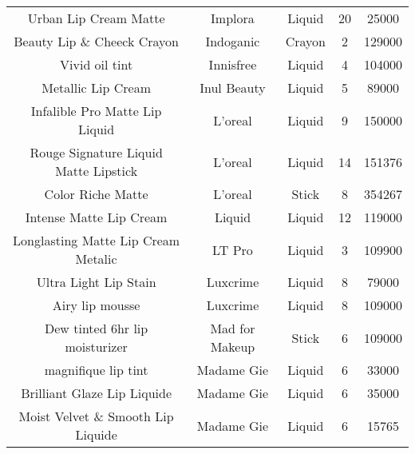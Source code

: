 \begin{table}[htbp]
\begin{tabular}{ccccc}
        Urban Lip Cream Matte                   & Implora           & Liquid                       & 20              & 25000          \\
        Beauty Lip \& Cheeck Crayon             & Indoganic         & Crayon                       & 2               & 129000         \\
        Vivid oil tint                          & Innisfree         & Liquid                       & 4               & 104000         \\
        Metallic Lip Cream                      & Inul Beauty       & Liquid                       & 5               & 89000          \\
        Infalible Pro Matte Lip Liquid          & L'oreal           & Liquid                       & 9               & 150000         \\
        Rouge Signature Liquid Matte Lipstick   & L'oreal           & Liquid                       & 14              & 151376         \\
        Color Riche Matte                       & L'oreal           & Stick                        & 8               & 354267         \\
        Intense Matte Lip Cream                 & Liquid            & Liquid                       & 12              & 119000         \\
        Longlasting Matte Lip Cream Metalic     & LT Pro            & Liquid                       & 3               & 109900         \\
        Ultra Light Lip Stain                   & Luxcrime          & Liquid                       & 8               & 79000          \\
        Airy lip mousse                         & Luxcrime          & Liquid                       & 8               & 109000         \\
        Dew tinted 6hr lip moisturizer          & Mad for Makeup    & Stick                        & 6               & 109000         \\
        magnifique lip tint                     & Madame Gie        & Liquid                       & 6               & 33000          \\
        Brilliant Glaze Lip Liquide             & Madame Gie        & Liquid                       & 6               & 35000          \\
        Moist Velvet \& Smooth Lip Liquide      & Madame Gie        & Liquid                       & 6               & 15765          \\

\end{tabular}
\end{table}
